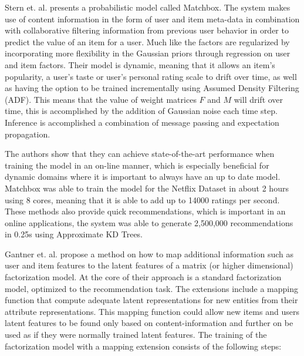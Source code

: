 
Stern et. al. \cite{Stern2009} presents a probabilistic model called Matchbox. The system makes use of content information in the form of user and
item meta-data in combination with collaborative filtering information from previous user behavior in order to predict the value of an item for a user. Much like \cite{Agarwal2009} the factors are regularized by incorporating more flexibility in the Gaussian priors through regression on user and item factors. Their model is dynamic, meaning that it allows an item's popularity, a user's taste or user's personal rating scale to drift over time, as well as having the option to be trained incrementally using Assumed Density Filtering (ADF). This means that the value of weight matrices $F$ and $M$ will drift over time, this is accomplished by the addition of Gaussian noise each time step. Inference is accomplished a combination of message passing and expectation propagation.

The authors show that they can achieve state-of-the-art performance when training the model in an on-line manner, which is especially beneficial for dynamic domains where it is important to always have an up to date model. Matchbox was able to train the model for the Netflix Dataset in about 2 hours using 8 cores, meaning that it is able to add up to 14000 ratings per second. These methods also provide quick recommendations, which is important in an online applications, the system was able to generate 2,500,000 recommendations in 0.25s using Approximate KD Trees.


Gantner et. al. \cite{Gantner2010} propose a method on how to map additional
information such as user and item features to the latent features of a matrix
(or higher dimensional) factorization model. At the core of their approach is a
standard factorization model, optimized to the recommendation task. The
extensions include a mapping function that compute adequate latent
representations for new entities from their attribute representations. This
mapping function could allow new items and users latent features to be found
only based on content-information and further on be used as if they were
normally trained latent features. The training of the factorization model with
a mapping extension consists of the following steps:

